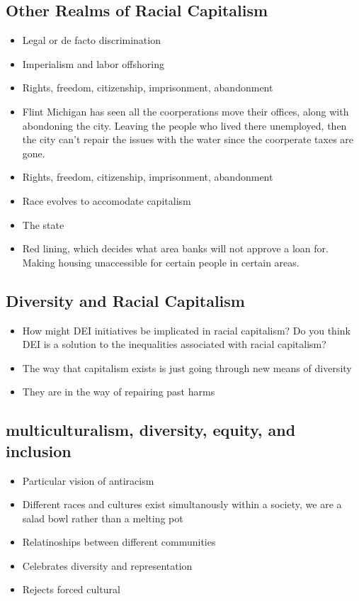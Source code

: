 \documentclass{article}
\begin{document}
\subsection{Other Realms of Racial Capitalism}
\begin{itemize}
  \item Legal or de facto discrimination
  \item Imperialism and labor offshoring
  \item Rights, freedom, citizenship, imprisonment, abandonment
  \item Flint Michigan has seen all the coorperations move their offices,
    along with abondoning the city. Leaving the people who lived there unemployed,
    then the city can't repair the issues with the water since the coorperate taxes are gone.
  \item Rights, freedom, citizenship, imprisonment, abandonment
  \item Race evolves to accomodate capitalism
  \item The state
  \item Red lining, which decides what area banks will not approve a loan for.
    Making housing unaccessible for certain people in certain areas.
\end{itemize}

\subsection{Diversity and Racial Capitalism}
\begin{itemize}
  \item How might DEI initiatives be implicated in racial capitalism?
    Do you think DEI is a solution to the inequalities associated with racial capitalism?
  \item The way that capitalism exists is just going through new means of diversity
  \item They are in the way of repairing past harms
\end{itemize}

\subsection{multiculturalism, diversity, equity, and inclusion}
\begin{itemize}
  \item Particular vision of antiracism
  \item Different races and cultures exist simultanously within a society,
    we are a salad bowl rather than a melting pot
  \item Relatinoships between different communities
  \item Celebrates diversity and representation
  \item Rejects forced cultural
\end{itemize}
  
\end{document}
